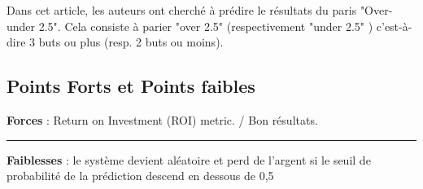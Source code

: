 \documentclass[11pt, a4paper]{article}
\begin{document}
Dans cet article, les auteurs ont cherché à prédire le résultats du paris 
"Over-under 2.5". Cela consiste à parier "over 2.5" (respectivement "under 2.5" ) 
c'est-à-dire 3 buts ou plus (resp. 2 buts ou moins).


\subsection{Points Forts et Points faibles}
\textbf{Forces} : Return on Investment (ROI) metric. / Bon résultats.

\vspace*{0.5cm}
\hrule
\vspace*{0.5cm}

\textbf{Faiblesses} : le système devient aléatoire et perd de l'argent si le 
seuil de probabilité de la prédiction descend en dessous de 0,5





\newpage
\nocite{*}


\end{document}
